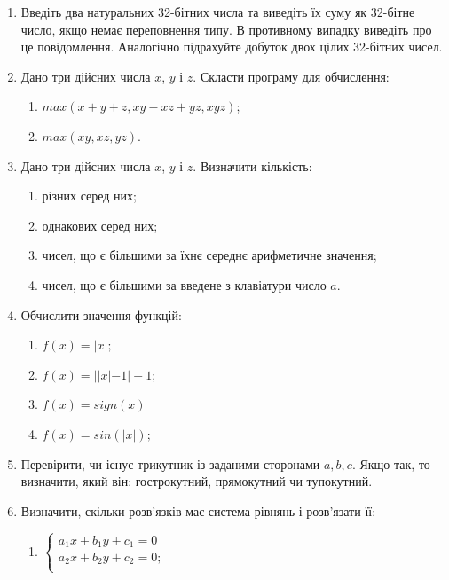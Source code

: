 \documentclass[a5paper,titlepage,openany,twoside,
]
{book_unv}%
\makeatletter
\newcommand{\xslalph}[1]{\expandafter\@xslalph\csname c@#1\endcsname}
\newcommand{\@xslalph}[1]{%
    \ifcase#1\or а\or б\or в\or г\or д\or e\or є\or ж\or з\or i%
    \or й\or к\or л\or м\or н\or о\or п\or р\or с\or т%
    \or у\or ф\or х\or ц\or ч\or ш\or ю\or я\or аа\or бб\or вв%
    \else\@ctrerr\fi%
}
\makeatother
\begin{document}
\begin{enumerate}
\def\labelenumi{\arabic{enumi})}
\setcounter{enumi}{7}
\item
  Введіть два натуральних 32-бітних числа та виведіть їх суму як
  32-бітне число, якщо немає переповнення типу. В противному випадку
  виведіть про це повідомлення. Аналогічно підрахуйте добуток двох цілих
  32-бітних чисел.
\item
  Дано три дійсних числа $x$, $y$ і $z$. Скласти програму для
  обчислення:
\begin{enumerate}[label=\xslalph*)]
\item
  \(max(x + y + z,xy- xz + yz,xyz)\);
\item
  \(max(xy,xz,yz)\).
\end{enumerate}

\item
  Дано три дійсних числа $x$, $y$ і $z$. Визначити кількість:
\begin{enumerate}[label=\xslalph*)]
\item різних серед них; 
\item однакових серед них;
\item чисел, що є більшими за їхнє середнє арифметичне значення;
\item чисел, що є більшими за введене з клавіатури число \(a\).
\end{enumerate}

\item
  Обчислити значення функцій:
  \begin{multicols}{2}
\begin{enumerate}[label=\xslalph*)]
\item \(f(x) = |x|;\) \item \(f(x) = ||x| - 1| - 1;\)
\item \(f(x) = sign(x)\) \item \(f(x) = sin(|x|);\)
\end{enumerate}
  \end{multicols}

\item
  Перевірити, чи існує трикутник із заданими сторонами $a,b,c$.
  Якщо так, то визначити, який він: гострокутний, прямокутний чи
  тупокутний.

\item
  Визначити, скільки розв'язків має система рівнянь і розв'язати її:
  \begin{multicols}{2}
\begin{enumerate}[label=\xslalph*)]
\item \(\left\{ \begin{matrix}
a_{1}x + b_{1}y + c_{1} = 0 \\
a_{2}x + b_{2}y + c_{2} = 0; \\
\end{matrix} \right.\ \) 


\end{enumerate}
\end{multicols}
\end{enumerate}
\end{document}

